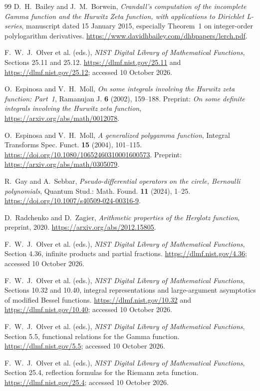 \begin{thebibliography}{99}
D.~H.~Bailey and J.~M.~Borwein, \emph{Crandall's computation of the
incomplete Gamma function and the Hurwitz Zeta function, with applications
to Dirichlet L-series}, manuscript dated 15 January 2015, especially
Theorem~1 on integer-order polylogarithm derivatives.
\url{https://www.davidhbailey.com/dhbpapers/lerch.pdf}.

F.~W.~J.~Olver et al. (eds.), \emph{NIST Digital Library of Mathematical
Functions}, Sections 25.11 and 25.12.
\url{https://dlmf.nist.gov/25.11} and
\url{https://dlmf.nist.gov/25.12}; accessed 10 October 2026.

O.~Espinosa and V.~H.~Moll,
\emph{On some integrals involving the Hurwitz zeta function: Part~1},
Ramanujan J. \textbf{6} (2002), 159--188.
Preprint: \emph{On some definite integrals involving the Hurwitz zeta function},
\url{https://arxiv.org/abs/math/0012078}.

O.~Espinosa and V.~H.~Moll, \emph{A generalized polygamma function},
Integral Transforms Spec. Funct. \textbf{15} (2004), 101--115.
\url{https://doi.org/10.1080/10652460310001600573}.
Preprint: \url{https://arxiv.org/abs/math/0305079}.

R.~Gay and A.~Sebbar,
\emph{Pseudo-differential operators on the circle, Bernoulli polynomials},
Quantum Stud.: Math. Found. \textbf{11} (2024), 1--25.
\url{https://doi.org/10.1007/s40509-024-00316-9}.

D.~Radchenko and D.~Zagier, \emph{Arithmetic properties of the Herglotz
function}, preprint, 2020.
\url{https://arxiv.org/abs/2012.15805}.

F.~W.~J.~Olver et al. (eds.), \emph{NIST Digital Library of Mathematical
Functions}, Section 4.36, infinite products and partial fractions.
\url{https://dlmf.nist.gov/4.36}; accessed 10 October 2026.

F.~W.~J.~Olver et al. (eds.), \emph{NIST Digital Library of Mathematical
Functions}, Sections 10.32 and 10.40, integral representations and
large-argument asymptotics of modified Bessel functions.
\url{https://dlmf.nist.gov/10.32} and
\url{https://dlmf.nist.gov/10.40}; accessed 10 October 2026.

F.~W.~J.~Olver et al. (eds.), \emph{NIST Digital Library of Mathematical
Functions}, Section 5.5, functional relations for the Gamma function.
\url{https://dlmf.nist.gov/5.5}; accessed 10 October 2026.

F.~W.~J.~Olver et al. (eds.), \emph{NIST Digital Library of Mathematical
Functions}, Section 25.4, reflection formulas for the Riemann zeta function.
\url{https://dlmf.nist.gov/25.4}; accessed 10 October 2026.

\end{thebibliography}
